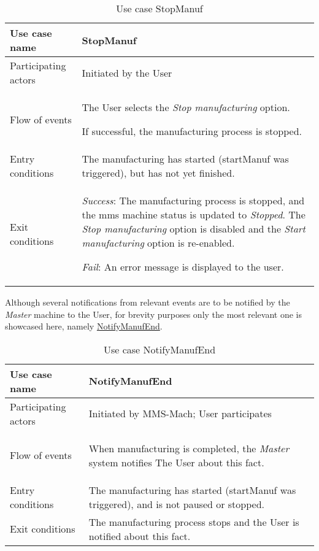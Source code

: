 \begin{table}
  \captionsetup{justification=raggedright, singlelinecheck=false}
  \caption{Use case StopManuf}
  \centering
  \begin{tabular}{p{}p{}}
    \hline
    Use case name & \textbf{StopManuf} \\ \hline
     Participating actors      & Initiated by the User \\ \hline
     Flow of events & \begin{enum-c}
     \item The User selects the \emph{Stop manufacturing} option.
     \item If successful, the manufacturing process is stopped.
     \end{enum-c}\\ \hline 
     Entry conditions & The manufacturing has started (startManuf was
     triggered), but has not yet finished. \\ \hline 
      Exit conditions & \begin{item-c}
      \item \emph{Success}: The manufacturing process is stopped, and
        the \gls{mms} machine status is updated to \emph{Stopped}. The
        \emph{Stop manufacturing} option is disabled and the \emph{Start
        manufacturing} option is re-enabled.
     \item \emph{Fail}: An error message is displayed to the user.
      \end{item-c}\\ \hline
  \end{tabular}
\label{tab:us-stop-manuf}
\end{table}

Although several notifications from relevant events are to be notified by the
\emph{Master} machine to the User, for brevity purposes only the most relevant one is
showcased here, namely \underline{NotifyManufEnd}.

\begin{table}
  \captionsetup{justification=raggedright, singlelinecheck=false}
  \caption{Use case NotifyManufEnd}
  \centering
  \begin{tabular}{p{}p{}}
    \hline
    Use case name & \textbf{NotifyManufEnd} \\ \hline
     Participating actors      & Initiated by MMS-Mach; User participates \\ \hline
     Flow of events & \begin{enum-c}
     \item When manufacturing is completed, the \emph{Master} system notifies The User
       about this fact.
     \end{enum-c}\\ \hline 
     Entry conditions & The manufacturing has started (startManuf was
     triggered), and is not paused or stopped. \\ \hline 
     Exit conditions & The manufacturing process stops and the User is notified
      about this fact.\\ \hline 
  \end{tabular}
\label{tab:us-notif-manuf-end}
\end{table}

